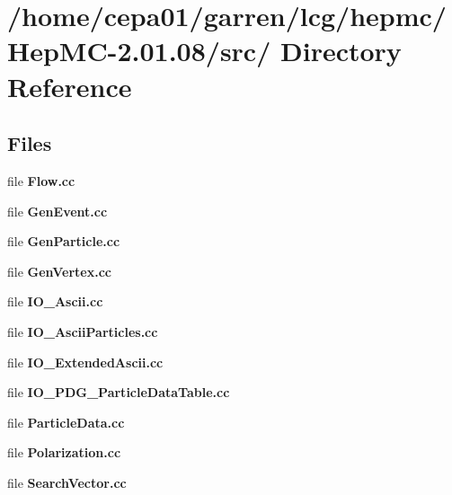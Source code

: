 \section{/home/cepa01/garren/lcg/hepmc/Hep\-MC-2.01.08/src/ Directory Reference}
\label{dir_6f5e1fd014b545bac6b7a8ff1c591f69}
\subsection*{Files}
\begin{CompactItemize}
\item 
file {\bf Flow.cc}
\item 
file {\bf Gen\-Event.cc}
\item 
file {\bf Gen\-Particle.cc}
\item 
file {\bf Gen\-Vertex.cc}
\item 
file {\bf IO\_\-Ascii.cc}
\item 
file {\bf IO\_\-Ascii\-Particles.cc}
\item 
file {\bf IO\_\-Extended\-Ascii.cc}
\item 
file {\bf IO\_\-PDG\_\-Particle\-Data\-Table.cc}
\item 
file {\bf Particle\-Data.cc}
\item 
file {\bf Polarization.cc}
\item 
file {\bf Search\-Vector.cc}
\end{CompactItemize}
